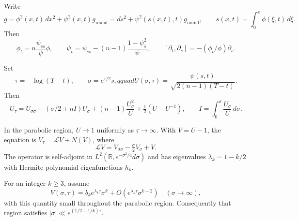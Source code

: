 \begin{definition}
\label{def:chow-iv-rotational-flow-equations}

Write
\[
 g=\phi^2(x,t)\,dx^2+\psi^2(x,t)g_{\mathrm{round}}
 =ds^2+\psi^2(s(x,t),t)g_{\mathrm{round}},\qquad
 s(x,t)=\int_0^x\phi(\xi,t)\,d\xi.
\]
Then
\[
 \phi_t=n\frac{\psi_{ss}}\psi\phi,
 \qquad \psi_t=\psi_{ss}-(n-1)\frac{1-\psi_s^2}{\psi},
 \qquad [\partial_t,\partial_s]=-(\phi_t/\phi)\partial_s.
\]
\end{definition}

\begin{definition}
\label{def:chow-iv-parabolic-rescaling}


Set
\[
 \tau=-\log(T-t),\qquad \sigma=e^{\tau/2}s,qquad
 U(\sigma,\tau)=\frac{\psi(s,t)}{\sqrt{2(n-1)(T-t)}}.
\]
Then
\[
 U_\tau=U_{\sigma\sigma}-(\sigma/2+nI)U_\sigma
 +(n-1)\frac{U_\sigma^2}{U}+\tfrac12(U-U^{-1}),
 \qquad I=\int_0^\sigma\frac{U_\sigma}{U}\,d\sigma.
\]
\end{definition}

\begin{definition}
\label{def:chow-iv-parabolic-linearization}


In the parabolic region, $U\to1$ uniformly as $\tau\to\infty$.  With
$V=U-1$, the equation is $V_\tau=\mathcal LV+N(V)$, where
\[
 \mathcal LV=V_{\sigma\sigma}-\tfrac\sigma2V_\sigma+V.
\]
The operator is self-adjoint in
$L^2(\mathbb R,e^{-\sigma^2/4}d\sigma)$ and has eigenvalues
$\lambda_k=1-k/2$ with Hermite-polynomial eigenfunctions $h_k$.
\end{definition}

\begin{definition}
\label{def:chow-iv-parabolic-leading-mode}


For an integer $k\ge3$, assume
\[
 V(\sigma,\tau)=b_ke^{\lambda_k\tau}\sigma^k
 +O(e^{\lambda_k\tau}\sigma^{k-2})
 \quad(\sigma\to\infty),
\]
with this quantity small throughout the parabolic region.  Consequently that
region satisfies $|\sigma|\ll e^{(1/2-1/k)\tau}$.
\end{definition}


